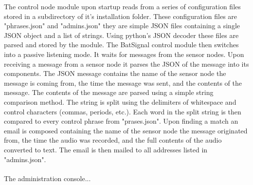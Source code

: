 \documentclass[11pt,a4paper]{article}
\begin{document}
The control node module upon startup reads from a series of configuration files stored in a subdirectory of it's installation folder.  These configuration files are "phrases.json" and "admins.json" they are simple JSON files containing a single JSON object and a list of strings.  Using python's JSON decoder these files are parsed and stored by the module.  The BatSignal control module then switches into a passive listening mode.  It waits for messages from the sensor nodes.  Upon receiving a message from a sensor node it parses the JSON of the message into its components.  The JSON message contains the name of the sensor node the message is coming from, the time the message was sent, and the contents of the message.  The contents of the message are parsed using a simple string comparison method.  The string is split using the delimiters of whitespace and control characters (commas, periods, etc.).  Each word in the split string is then compared to every control phrase from "prases.json".  Upon finding a match an email is composed containing the name of the sensor node the message originated from, the time the audio was recorded, and the full contents of the audio converted to text.  The email is then mailed to all addresses listed in "admins.json".  \\\\
The administration console... 
\end{document}

